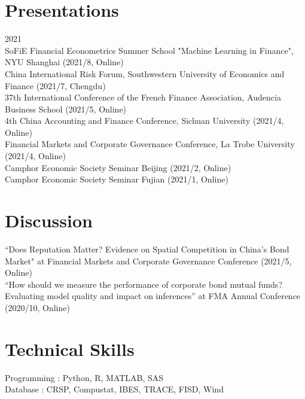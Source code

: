 \documentclass[margin]{res}
\begin{document}
\begin{resume}
\section{\sc Presentations}

2021 \\
SoFiE Financial Econometrics Summer School "Machine Learning in Finance", NYU Shanghai (2021/8, Online) \\
China International Risk Forum, Southwestern University of Economics and Finance (2021/7, Chengdu) \\
37th International Conference of the French Finance Association, Audencia Business School (2021/5, Online) \\
4th China Accounting and Finance Conference, Sichuan University (2021/4, Online) \\
Financial Markets and Corporate Governance Conference, La Trobe University (2021/4, Online) \\
Camphor Economic Society Seminar Beijing (2021/2, Online) \\
Camphor Economic Society Seminar Fujian (2021/1, Online) \\


\section{\sc Discussion}

``Does Reputation Matter? Evidence on Spatial Competition in China’s Bond Market" at Financial Markets and Corporate Governance Conference (2021/5, Online)
\\
``How should we measure the performance of corporate bond mutual funds? Evaluating model quality and impact on inferences'' at FMA Annual Conference (2020/10, Online)

%

\section{\sc Technical Skills}

Programming : Python, R, MATLAB, SAS
\\
Database : CRSP, Compustat, IBES, TRACE, FISD, Wind



\end{resume}
\(\)
\end{document}
